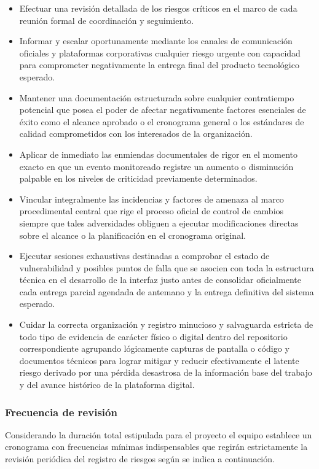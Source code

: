 \documentclass[11pt,spanish]{article}
\begin{document}
\begin{itemize}
    \item Efectuar una revisión detallada de los riesgos críticos en el marco de cada reunión formal de coordinación y seguimiento.
    \item Informar y escalar oportunamente mediante los canales de comunicación oficiales y plataformas corporativas cualquier riesgo urgente con capacidad para comprometer negativamente la entrega final del producto tecnológico esperado.
    \item Mantener una documentación estructurada sobre cualquier contratiempo potencial que posea el poder de afectar negativamente factores esenciales de éxito como el alcance aprobado o el cronograma general o los estándares de calidad comprometidos con los interesados de la organización.
    \item Aplicar de inmediato las enmiendas documentales de rigor en el momento exacto en que un evento monitoreado registre un aumento o disminución palpable en los niveles de criticidad previamente determinados.
    \item Vincular integralmente las incidencias y factores de amenaza al marco procedimental central que rige el proceso oficial de control de cambios siempre que tales adversidades obliguen a ejecutar modificaciones directas sobre el alcance o la planificación en el cronograma original.
    \item Ejecutar sesiones exhaustivas destinadas a comprobar el estado de vulnerabilidad y posibles puntos de falla que se asocien con toda la estructura técnica en el desarrollo de la interfaz justo antes de consolidar oficialmente cada entrega parcial agendada de antemano y la entrega definitiva del sistema esperado.
    \item Cuidar la correcta organización y registro minucioso y salvaguarda estricta de todo tipo de evidencia de carácter físico o digital dentro del repositorio correspondiente agrupando lógicamente capturas de pantalla o código y documentos técnicos para lograr mitigar y reducir efectivamente el latente riesgo derivado por una pérdida desastrosa de la información base del trabajo y del avance histórico de la plataforma digital.
\end{itemize}

\subsubsection{Frecuencia de revisión}

Considerando la duración total estipulada para el proyecto el equipo establece un cronograma con frecuencias mínimas indispensables que regirán estrictamente la revisión periódica del registro de riesgos según se indica a continuación.
\end{document}
